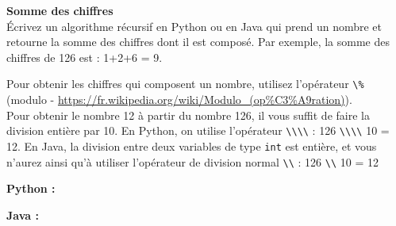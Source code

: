 \begin{Exercice} [5 minutes] \textbf{Somme des chiffres} \\
Écrivez un algorithme récursif en Python ou en Java qui prend un nombre et retourne la somme des chiffres dont il est composé. Par exemple, la somme des chiffres de 126 est : 1+2+6 = 9.

\begin{conseil}

Pour obtenir les chiffres qui composent un nombre, utilisez l'opérateur \lstinline{\%} (modulo - \url{https://fr.wikipedia.org/wiki/Modulo\_(op\%C3\%A9ration)}). \\
Pour obtenir le nombre 12 à partir du nombre 126, il vous suffit de faire la division entière par 10. En Python, on utilise l'opérateur \lstinline{\\\\} : 126 \lstinline{\\\\} 10 = 12. En Java, la division entre deux variables de type \lstinline{int} est entière, et vous n'aurez ainsi qu'à utiliser l'opérateur de division normal \lstinline{\\} : 126 \lstinline{\\} 10 = 12

\end{conseil}

\begin{solution}
\textbf{Python :}
    
            
\textbf{Java :}
   

\end{solution}
\end{Exercice}


